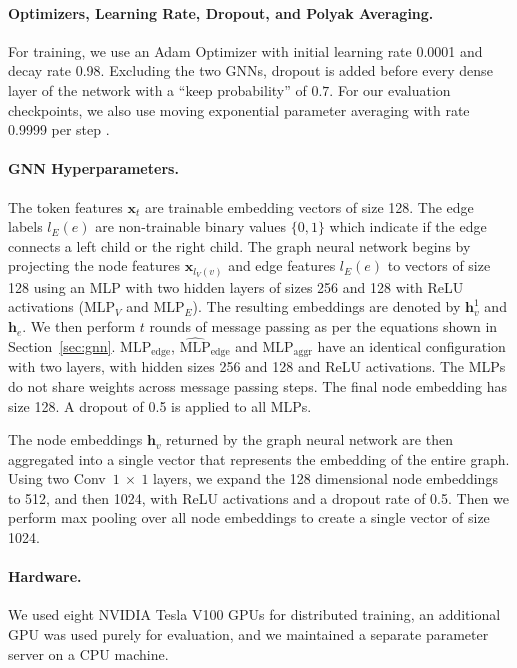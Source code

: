 \documentclass[letterpaper]{article} \usepackage{aaai20}  \usepackage{times}  \usepackage{helvet} \usepackage{courier}  \usepackage[hyphens]{url}  \usepackage{graphicx} \urlstyle{rm} \def\UrlFont{\rm}  \usepackage{graphicx}  \frenchspacing  \setlength{\pdfpagewidth}{8.5in}  \setlength{\pdfpageheight}{11in}
\newcommand{\citep}{\cite}
\begin{document}
\paragraph{Optimizers, Learning Rate, Dropout, and Polyak Averaging.}
For training, we use an Adam Optimizer \citep{kingma2014adam} with initial learning rate 0.0001 and decay rate 0.98. Excluding the two GNNs, dropout is added before every dense layer of the network with a ``keep probability'' of $0.7$.
For our evaluation checkpoints, we also use moving exponential parameter averaging with rate 0.9999 per step \citep{polyak1990new,polyak1992acceleration}.

\paragraph{GNN Hyperparameters.}
The token features $\bm{x}_{t}$ are trainable embedding vectors of size 128. The edge labels $l_E(e)$ are non-trainable binary values $\{0, 1\}$ which indicate if the edge connects a left child or the right child.
The graph neural network begins by projecting the node features $\bm{x}_{l_V(v)}$ and edge features $l_E(e)$ to vectors of size 128 using an MLP with two hidden layers of sizes 256 and 128 with ReLU activations ($\textrm{MLP}_V$ and $\textrm{MLP}_E$). The resulting embeddings are denoted by $\bm{h}^1_v$ and $\bm{h}_e$.
We then perform $t$ rounds of message passing as per the equations shown in Section~\ref{sec:gnn}. $\textrm{MLP}_{\textrm{edge}}$, $\hat{\textrm{MLP}}_{\textrm{edge}}$ and $\textrm{MLP}_{\textrm{aggr}}$ have an identical configuration with two layers, with hidden sizes 256 and 128 and ReLU activations. The MLPs do not share weights across message passing steps.
The final node embedding has size 128.
A dropout of 0.5 is applied to all MLPs.

The node embeddings $\bm{h}_v$ returned by the graph neural network are then aggregated into a single vector that represents the embedding of the entire graph.
Using two Conv~$1~\times~1$ layers, we expand the 128 dimensional node embeddings to 512, and then 1024, with ReLU activations and a dropout rate of 0.5. Then we perform max pooling over all node embeddings to create a single vector of size 1024.

\paragraph{Hardware.}
We used eight NVIDIA Tesla V100 GPUs for distributed training, an additional GPU was used purely for evaluation, and we maintained a separate parameter server on a CPU machine.
\end{document}

